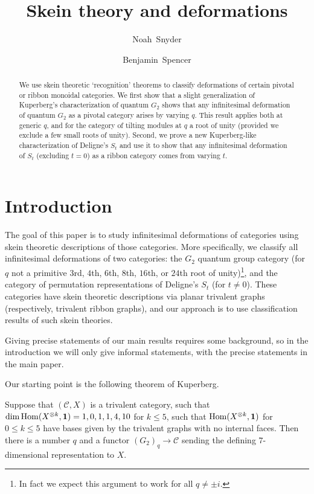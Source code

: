 \documentclass[12pt]{amsart}
\begin{document}
\title{Skein theory and deformations}

\author[Snyder]{Noah~Snyder}

\author[Spencer]{Benjamin~Spencer}


\begin{abstract}
    We use skein theoretic `recognition' theorems to classify deformations of certain pivotal or ribbon monoidal categories. We first show that a slight generalization of Kuperberg's characterization of quantum $G_2$ shows that any infinitesimal deformation of quantum $G_2$ as a pivotal category arises by varying $q$. This result applies both at generic $q$, and for the category of tilting modules at $q$ a root of unity (provided we exclude a few small roots of unity).
    Second, we prove a new Kuperberg-like characterization of Deligne's $S_t$ and use it to show that any infinitesimal deformation of $S_t$ (excluding $t=0$) as a ribbon category comes from varying $t$.
\end{abstract}

\maketitle

\section{Introduction} \label{sec:introduction}

The goal of this paper is to study infinitesimal deformations of categories using skein theoretic descriptions of those categories. More specifically, we classify all infinitesimal deformations of two categories: the $G_2$ quantum group category (for $q$ not a primitive $3$rd, $4$th, $6$th, $8$th, $16$th, or $24$th root of unity)\footnote{In fact we expect this argument to work for all $q\neq \pm i$.}, and the category of permutation representations of Deligne's $S_t$ (for $t\neq 0$). These categories have skein theoretic descriptions via planar trivalent graphs (respectively, trivalent ribbon graphs), and our approach is to use classification results of such skein theories.

Giving precise statements of our main results requires some background, so in the introduction we will only give informal statements, with the precise statements in the main paper.

Our starting point is the following theorem of Kuperberg.

\begin{theorem}\cite{MR1265145} \label{thm:intro-G2}
    Suppose that $(\mathcal{C},X)$ is a trivalent category, such that $\dim \operatorname{Hom}(X^{\otimes k}, \mathbf{1}) = 1,0,1,1,4,10$ for $k\leq 5$, such that $\operatorname{Hom}(X^{\otimes k}, \mathbf{1})$ for $0 \leq k \leq 5$ have bases given by the trivalent graphs with no internal faces. Then there is a number $q$ and a functor $(G_2)_q \rightarrow \mathcal{C}$ sending the defining $7$-dimensional representation to $X$.
\end{theorem}
\end{document}
